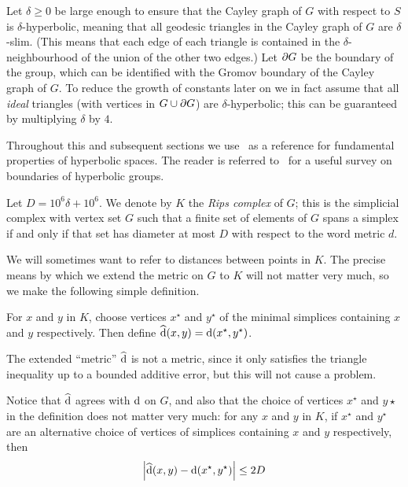 \documentclass[a4paper]{article}
\begin{document}
Let $\delta \geq 0$ be large enough to ensure that the Cayley graph of $G$ with
respect to $S$ is $\delta$-hyperbolic, meaning that all geodesic triangles in
the Cayley graph of $G$ are $\delta$-slim. (This means that each edge of each
triangle is contained in the $\delta$-neighbourhood of the union of the other
two edges.) Let $\partial G$ be the boundary of the group, which can be
identified with the Gromov boundary of the Cayley graph of $G$. To reduce the
growth of constants later on we in fact assume that all \emph{ideal} triangles
(with vertices in $G \cup \partial G$) are $\delta$-hyperbolic; this can be
guaranteed by multiplying $\delta$ by $4$.  

Throughout this and subsequent sections we use~\cite{bridsonhaefliger99} as a
reference for fundamental properties of hyperbolic spaces. The reader is
referred to~\cite{benaklikapovich00} for a useful survey on boundaries of
hyperbolic groups.

\begin{definition}
  Let $D = 10^6\delta + 10^6$.  We denote by $K$ the \emph{Rips complex} of
  $G$; this is the simplicial complex with vertex set $G$ such that a finite
  set of elements of $G$ spans a simplex if and only if that set has diameter
  at most $D$ with respect to the word metric $d$.
\end{definition}

We will sometimes want to refer to distances between points in $K$. The
precise means by which we extend the metric on $G$ to $K$ will not matter
very much, so we make the following simple definition.

\begin{definition}
  For $x$ and $y$ in $K$, choose vertices $x^\star$ and $y^\star$ of the
  minimal simplices containing $x$ and $y$ respectively. Then define
  $\operatorname{\widehat{d}}(x,y) = \operatorname{d}(x^\star, y^\star)$.  
\end{definition}

\begin{remark}\label{rem:dist_vs_newdist}
  The extended ``metric'' $\operatorname{\widehat{d}}$ is not a metric, since it only satisfies
  the triangle inequality up to a bounded additive error, but this will not
  cause a problem.

  Notice that $\operatorname{\widehat{d}}$ agrees with $\operatorname{d}$ on $G$, and also that the choice
  of vertices $x^\star$ and $y\star$ in the definition does not matter very
  much: for any $x$ and $y$ in $K$, if $x^\star$ and $y^\star$ are an
  alternative choice of vertices of simplices containing $x$ and $y$
  respectively, then
  \begin{equation*}
    \left|\operatorname{\widehat{d}}(x,y) - \operatorname{d}(x^\star, y^\star)\right| \leq 2D
  \end{equation*}
\end{remark}
\end{document}
